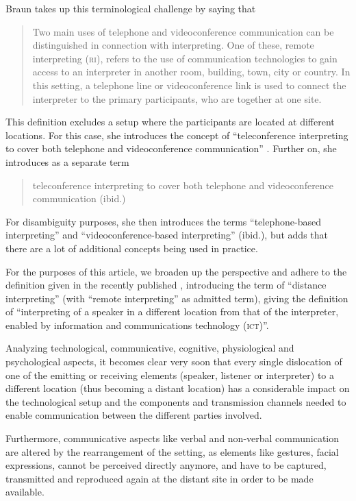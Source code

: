 \documentclass[output=paper]{langsci/langscibook}
\begin{document}
Braun takes up this terminological challenge by saying that 

\begin{quote}
Two main uses of telephone and videoconference communication can be distinguished in connection with interpreting. One of these, {remote interpreting (\textsc{ri})}, refers to the use of communication technologies to gain access to an interpreter in another room, building, town, city or country. In this setting, a telephone line or videoconference link is used to connect the interpreter to the primary participants, who are together at one site. \citep[1]{Braun2015}
\end{quote}

This definition excludes a setup where the participants are located at different locations. For this case, she introduces the concept of “{teleconference interpreting} to cover both telephone and videoconference communication” \citep[2]{Braun2015}. Further on, she introduces as a separate term

\begin{quote}
	{teleconference interpreting} to cover both telephone and videoconference communication (ibid.)
\end{quote}

For disambiguity purposes, she then introduces the terms “{telephone-based interpreting}” and “{videoconference-based interpreting}” (ibid.), but adds that there are a lot of additional concepts being used in practice.

For the purposes of this article, we broaden up the perspective and adhere to the definition given in the recently published \citet{ISO20108}, introducing the term of ``distance interpreting'' (with ``remote interpreting'' as admitted term), giving the definition of ``interpreting of a speaker in a different location from that of the interpreter, enabled by information and communications technology (\textsc{ict})''. 

Analyzing technological, communicative, cognitive, physiological and psychological aspects, it becomes clear very soon that every single dislocation of one of the emitting or receiving elements (speaker, listener or interpreter) to a different location (thus becoming a distant location) has a considerable impact on the technological setup and the components and transmission channels needed to enable communication between the different parties involved. 

Furthermore, communicative aspects like verbal and non-verbal communication are altered by the rearrangement of the setting, as elements like gestures, facial expressions, cannot be perceived directly anymore, and have to be captured, transmitted and reproduced again at the distant site in order to be made available.
\end{document}
